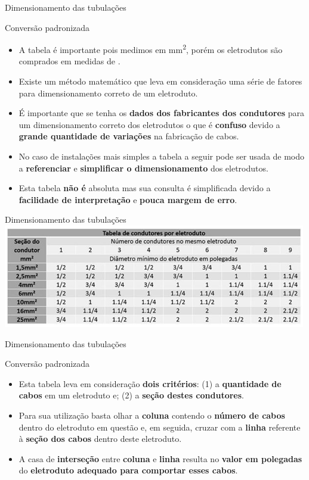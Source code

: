 
\begin{frame}{Dimensionamento das tubulações}
	\begin{block}{Conversão padronizada}
		\begin{itemize}
			\item A tabela é importante pois medimos em \si{\milli\meter\squared}, porém os eletrodutos são comprados em medidas de \si{\square\pol}.
			\item Existe um método matemático que leva em consideração uma série de fatores para dimensionamento correto de um eletroduto.
			\item É importante que se tenha os \textbf{dados dos fabricantes dos condutores }para um dimensionamento correto dos eletrodutos o que é \textbf{confuso} devido a \textbf{grande quantidade de variações} na fabricação de cabos.
			\item No caso de instalações mais simples a tabela a seguir pode ser usada de modo a \textbf{referenciar} e \textbf{simplificar o dimensionamento} dos eletrodutos.
			\item Esta tabela \textbf{não é} absoluta mas sua consulta é simplificada devido a \textbf{facilidade de interpretação} e \textbf{pouca margem de erro}.
		\end{itemize}
	\end{block}
\end{frame}


\begin{frame}{Dimensionamento das tubulações}
	\centering
	\includegraphics[width=1\linewidth]{Figuras/Ch06/fig10}
\end{frame}


\begin{frame}{Dimensionamento das tubulações}
	\begin{block}{Conversão padronizada}
		\begin{itemize}
			\item Esta tabela leva em consideração \textbf{dois critérios}: (1) a \textbf{quantidade de cabos }em um eletroduto e; (2) a \textbf{seção destes condutores}.
			\item Para sua utilização basta olhar a \textbf{coluna} contendo o \textbf{número de cabos }dentro do eletroduto em questão e, em seguida, cruzar com a \textbf{linha }referente à \textbf{seção dos cabos }dentro deste eletroduto.
			\item A casa de \textbf{interseção} entre \textbf{coluna }e \textbf{linha }resulta no \textbf{valor em polegadas }do \textbf{eletroduto adequado para comportar esses cabos}.
		\end{itemize}
	\end{block}
\end{frame}


